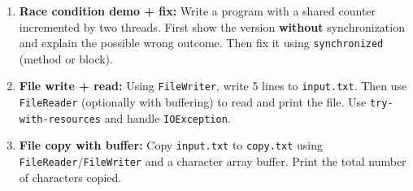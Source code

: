 \documentclass[11pt,a4paper]{article}
\begin{document}
\begin{enumerate}[label=M\arabic*., leftmargin=*]
  \item \textbf{Race condition demo + fix:} Write a program with a shared counter incremented by two threads.
    First show the version \textbf{without} synchronization and explain the possible wrong outcome.
    Then fix it using \texttt{synchronized} (method or block).

  \item \textbf{File write + read:} Using \texttt{FileWriter}, write 5 lines to \texttt{input.txt}.
    Then use \texttt{FileReader} (optionally with buffering) to read and print the file.
    Use \texttt{try-with-resources} and handle \texttt{IOException}.

  \item \textbf{File copy with buffer:} Copy \texttt{input.txt} to \texttt{copy.txt} using \texttt{FileReader}/\texttt{FileWriter}
    and a character array buffer. Print the total number of characters copied.
\end{enumerate}
\end{document}
